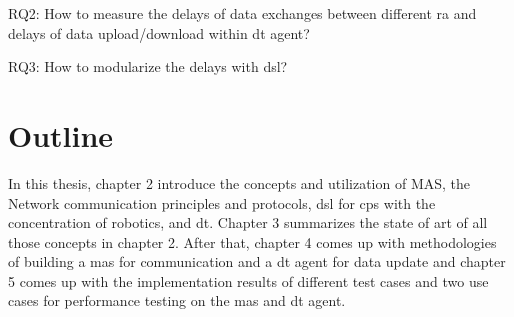 RQ2: How to measure the delays of data exchanges between different \gls{ra} and delays of data upload/download within \gls{dt} agent?

RQ3: How to modularize the delays with \gls{dsl}?



\section{Outline}
In this thesis, chapter 2 introduce the concepts and utilization of MAS, the Network communication principles and protocols, \gls{dsl} for \gls{cps} with the concentration of robotics, and \gls{dt}. Chapter 3 summarizes the state of art of all those concepts in chapter 2. After that, chapter 4 comes up with methodologies of building a \gls{mas} for communication and a \gls{dt} agent for data update and chapter 5 comes up with the implementation results of different test cases and two use cases for performance testing on the \gls{mas} and \gls{dt} agent.
